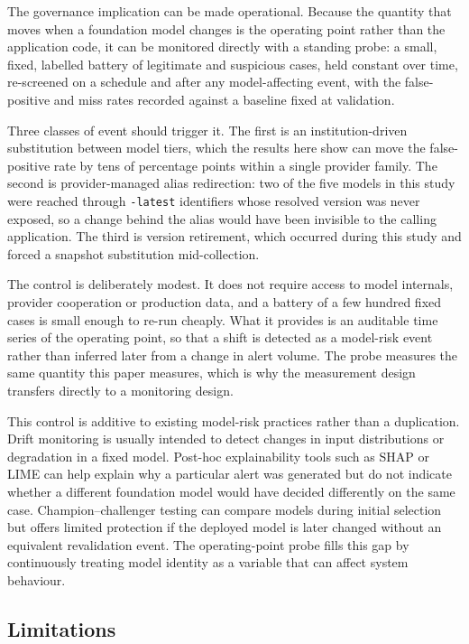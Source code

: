 \documentclass[pdflatex,sn-basic,Numbered]{sn-jnl}
\newcommand{\HLtext}[1]{\texthl{#1}}
\newcommand{\HLcode}[1]{\texthl{#1}}
\newcommand{\HLdel}[1]{\textcolor{HLink}{\sout{#1}}}
\newcommand{\HLhead}[1]{\textcolor{HLink}{#1}}
\renewcommand{\HLhead}[1]{#1}\renewcommand{\HLcode}[1]{#1}%
\renewcommand{\HLtext}[1]{#1}\renewcommand{\HLdel}[1]{#1}%
\begin{document}
\HLtext{The governance implication can be made operational. Because the quantity that moves when a foundation model changes is the operating point rather than the application code, it can be monitored directly with a standing probe: a small, fixed, labelled battery of legitimate and suspicious cases, held constant over time, re-screened on a schedule and after any model-affecting event, with the false-positive and miss rates recorded against a baseline fixed at validation.}

\HLtext{Three classes of event should trigger it. The first is an institution-driven substitution between model tiers, which the results here show can move the false-positive rate by tens of percentage points within a single provider family. The second is provider-managed alias redirection: two of the five models in this study were reached through} \texttt{-latest} \HLtext{identifiers whose resolved version was never exposed, so a change behind the alias would have been invisible to the calling application. The third is version retirement, which occurred during this study and forced a snapshot substitution mid-collection.}

\HLtext{The control is deliberately modest. It does not require access to model internals, provider cooperation or production data, and a battery of a few hundred fixed cases is small enough to re-run cheaply. What it provides is an auditable time series of the operating point, so that a shift is detected as a model-risk event rather than inferred later from a change in alert volume. The probe measures the same quantity this paper measures, which is why the measurement design transfers directly to a monitoring design.}

\HLtext{This control is additive to existing model-risk practices rather than a duplication. Drift monitoring is usually intended to detect changes in input distributions or degradation in a fixed model. Post-hoc explainability tools such as SHAP or LIME can help explain why a particular alert was generated but do not indicate whether a different foundation model would have decided differently on the same case. Champion--challenger testing can compare models during initial selection but offers limited protection if the deployed model is later changed without an equivalent revalidation event. The operating-point probe fills this gap by continuously treating model identity as a variable that can affect system behaviour.}

\subsection{\HLhead{Limitations}}\label{sec:limits}
\end{document}
